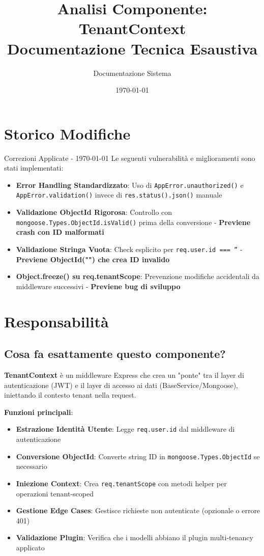 \documentclass[11pt,a4paper]{article}
\title{\textbf{Analisi Componente: TenantContext}\\
\large Documentazione Tecnica Esaustiva}
\author{Documentazione Sistema}
\date{\today}
\begin{document}
\maketitle
\tableofcontents
\newpage

\section{Storico Modifiche}

\begin{importantbox}{Correzioni Applicate - \today}
Le seguenti vulnerabilità e miglioramenti sono stati implementati:
\begin{itemize}
    \item \textbf{Error Handling Standardizzato}: Uso di \texttt{AppError.unauthorized()} e \texttt{AppError.validation()} invece di \texttt{res.status().json()} manuale
    \item \textbf{Validazione ObjectId Rigorosa}: Controllo con \texttt{mongoose.Types.ObjectId.isValid()} prima della conversione - \textbf{Previene crash con ID malformati}
    \item \textbf{Validazione Stringa Vuota}: Check esplicito per \texttt{req.user.id === ''} - \textbf{Previene ObjectId("") che crea ID invalido}
    \item \textbf{Object.freeze() su req.tenantScope}: Prevenzione modifiche accidentali da middleware successivi - \textbf{Previene bug di sviluppo}
\end{itemize}
\end{importantbox}

\section{Responsabilità}

\subsection{Cosa fa esattamente questo componente?}

\textbf{TenantContext} è un middleware Express che crea un "ponte" tra il layer di autenticazione (JWT) e il layer di accesso ai dati (BaseService/Mongoose), iniettando il contesto tenant nella request.

\textbf{Funzioni principali}:
\begin{itemize}
    \item \textbf{Estrazione Identità Utente}: Legge \texttt{req.user.id} dal middleware di autenticazione
    \item \textbf{Conversione ObjectId}: Converte string ID in \texttt{mongoose.Types.ObjectId} se necessario
    \item \textbf{Iniezione Context}: Crea \texttt{req.tenantScope} con metodi helper per operazioni tenant-scoped
    \item \textbf{Gestione Edge Cases}: Gestisce richieste non autenticate (opzionale o errore 401)
    \item \textbf{Validazione Plugin}: Verifica che i modelli abbiano il plugin multi-tenancy applicato
\end{itemize}
\end{document}
